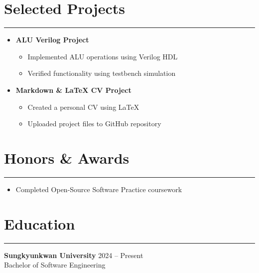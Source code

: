 \documentclass[letterpaper, 10pt]{article}
\begin{document}
\section*{Selected Projects}
\hrule
\vspace{4pt}
\begin{itemize}
\item \textbf{ALU Verilog Project}
\begin{itemize}
\item Implemented ALU operations using Verilog HDL
\item Verified functionality using testbench simulation
\end{itemize}

\item \textbf{Markdown \& LaTeX CV Project}
\begin{itemize}
\item Created a personal CV using LaTeX
\item Uploaded project files to GitHub repository
\end{itemize}
\end{itemize}
\section*{Honors \& Awards}
\hrule
\vspace{4pt}
\begin{itemize}
\item Completed Open-Source Software Practice coursework
\end{itemize}
\section*{Education}
\hrule
\vspace{4pt}
\textbf{Sungkyunkwan University} \hfill 2024 -- Present \\
Bachelor of Software Engineering
\end{document}
